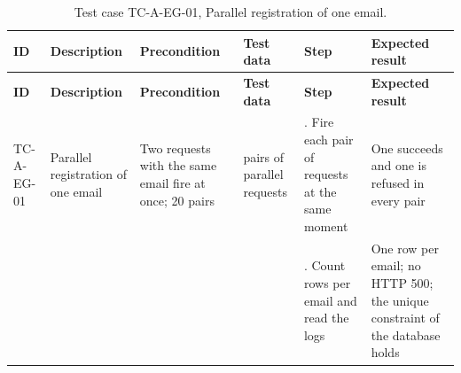 {\footnotesize{}\renewcommand{\arraystretch}{1.1}
\begin{longtable}{|>{\raggedright\arraybackslash}p{}|>{\raggedright\arraybackslash}p{}|>{\raggedright\arraybackslash}p{}|>{\raggedright\arraybackslash}p{}|>{\raggedright\arraybackslash}p{}|>{\raggedright\arraybackslash}p{}|}
\caption{Test case TC-A-EG-01, Parallel registration of one email.} \\
\hline
\textbf{ID} & \textbf{Description} & \textbf{Precondition} & \textbf{Test data} & \textbf{Step} & \textbf{Expected result} \\ \hline
\endfirsthead
\hline
\textbf{ID} & \textbf{Description} & \textbf{Precondition} & \textbf{Test data} & \textbf{Step} & \textbf{Expected result} \\ \hline
\endhead
TC-A-EG-01 & Parallel registration of one email & Two requests with the same email fire at once; 20 pairs & 20 pairs of parallel requests & 1. Fire each pair of requests at the same moment & One succeeds and one is refused in every pair \\ \cline{5-6}
 &  &  &  & 2. Count rows per email and read the logs & One row per email; no HTTP 500; the unique constraint of the database holds \\ \hline
\end{longtable}
}

